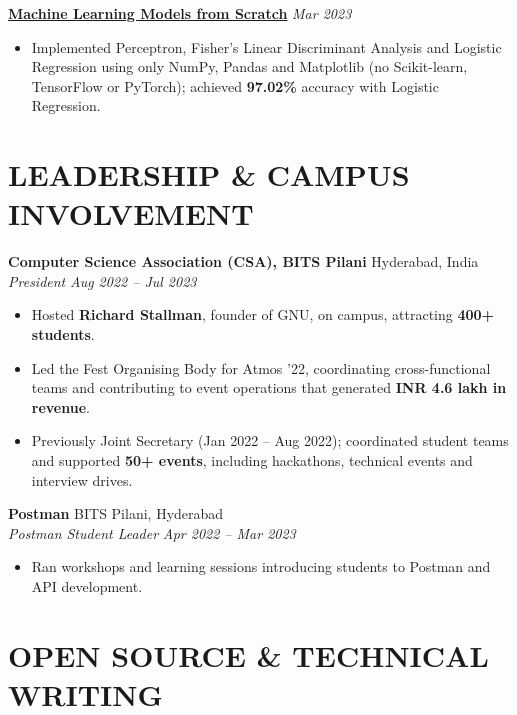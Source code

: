 \documentclass[a4paper,10pt]{extarticle}
\newcommand{\resumeSubheading}[4]{%
    \textbf{#1} \hfill #2\\
    \textit{#3} \hfill \textit{#4}}
\newcommand{\projectHeading}[2]{\textbf{#1} \hfill \textit{#2}}
\begin{document}
\vspace{3pt}
\projectHeading
{\href{https://github.com/shivansh-13/ML-models-LR-Percptron-FLDA}{Machine Learning Models from Scratch}}
{Mar 2023}

\begin{itemize}
    \item Implemented Perceptron, Fisher's Linear Discriminant Analysis and Logistic Regression
    using only NumPy, Pandas and Matplotlib (no Scikit-learn, TensorFlow or PyTorch); achieved
    \textbf{97.02\%} accuracy with Logistic Regression.
\end{itemize}

\section*{LEADERSHIP \& CAMPUS INVOLVEMENT}

\resumeSubheading
{Computer Science Association (CSA), BITS Pilani}
{Hyderabad, India}
{President}
{Aug 2022 -- Jul 2023}

\begin{itemize}
    \item Hosted \textbf{Richard Stallman}, founder of GNU, on campus, attracting \textbf{400+
    students}.

    \item Led the Fest Organising Body for Atmos '22, coordinating cross-functional teams and
    contributing to event operations that generated \textbf{INR 4.6 lakh in revenue}.

    \item Previously Joint Secretary (Jan 2022 -- Aug 2022); coordinated student teams and
    supported \textbf{50+ events}, including hackathons, technical events and interview drives.
\end{itemize}

\vspace{3pt}
\resumeSubheading
{Postman}
{BITS Pilani, Hyderabad}
{Postman Student Leader}
{Apr 2022 -- Mar 2023}

\begin{itemize}
    \item Ran workshops and learning sessions introducing students to Postman and API development.
\end{itemize}

\section*{OPEN SOURCE \& TECHNICAL WRITING}
\end{document}
